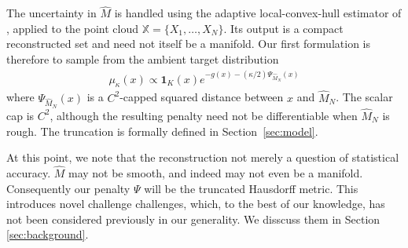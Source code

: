 \documentclass{article}
\newcommand{\wideM}{\widehat M_N}
\newcommand{\imon}[1]{{\color{purple} #1}}
\numberwithin{equation}{section}
\newcommand{\Xbb}{\mathbb{X}}
\begin{document}

The uncertainty in $\widehat M$ is handled using the adaptive local-convex-hull
estimator of \citet{divol2021}, applied to the point cloud
$\Xbb = \{ X_1,\dots,X_N \}$. Its output is a compact reconstructed set and
need not itself be a manifold. Our first formulation is therefore to sample
from the ambient target distribution
\begin{align}
  \mu_\kappa(x) \propto \mathbf 1_K(x)
  e^{-g(x)-(\kappa/2) \Psi_{\wideM}(x)}
  \label{eq:first_formulation}\tag{Manifold Method}
\end{align}
where $\Psi_{\wideM}(x)$ is a $C^2$-capped squared distance between $x$
and $\wideM$. The scalar cap is $C^2$, although the resulting penalty need
not be differentiable when $\wideM$ is rough. The truncation is formally
defined in Section~\ref{sec:model}. 

At this point, we note that the reconstruction not merely a question of statistical accuracy. $\widehat{M}$ may not be smooth, and indeed may not even be a manifold. Consequently our penalty $\Psi$ will be the truncated Hausdorff metric. This introduces novel challenge challenges, which, to the best of our knowledge, has not been considered previously in our generality. We disscuss them in Section \ref{sec:background}.


\end{document}
